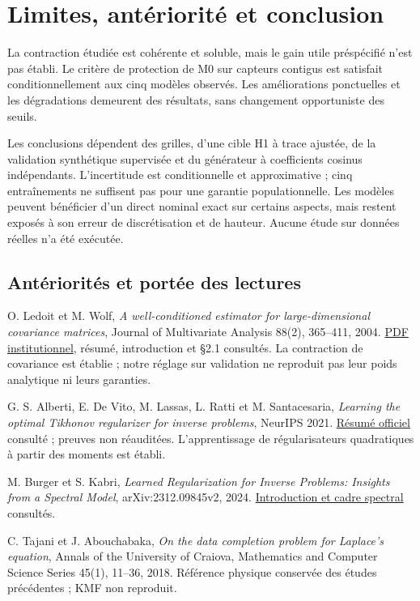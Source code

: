 \documentclass[11pt,a4paper]{article}
\begin{document}
\newpage
\section{Limites, antériorité et conclusion}
La contraction étudiée est cohérente et soluble, mais le gain utile préspécifié n'est pas établi. Le critère de protection de M0 sur capteurs contigus est satisfait conditionnellement aux cinq modèles observés. Les améliorations ponctuelles et les dégradations demeurent des résultats, sans changement opportuniste des seuils.

Les conclusions dépendent des grilles, d'une cible H1 à trace ajustée, de la validation synthétique supervisée et du générateur à coefficients cosinus indépendants. L'incertitude est conditionnelle et approximative ; cinq entraînements ne suffisent pas pour une garantie populationnelle. Les modèles peuvent bénéficier d'un direct nominal exact sur certains aspects, mais restent exposés à son erreur de discrétisation et de hauteur. Aucune étude sur données réelles n'a été exécutée.

\subsection*{Antériorités et portée des lectures}
O. Ledoit et M. Wolf, \emph{A well-conditioned estimator for large-dimensional covariance matrices}, Journal of Multivariate Analysis 88(2), 365--411, 2004. \href{https://www.econ.uzh.ch/dam/jcr:ffffffff-961c-1dd9-ffff-ffffceb83f14/wellCond.pdf}{PDF institutionnel}, résumé, introduction et §2.1 consultés. La contraction de covariance est établie ; notre réglage sur validation ne reproduit pas leur poids analytique ni leurs garanties.

G. S. Alberti, E. De Vito, M. Lassas, L. Ratti et M. Santacesaria, \emph{Learning the optimal Tikhonov regularizer for inverse problems}, NeurIPS 2021. \href{https://papers.nips.cc/paper_files/paper/2021/hash/d3e6cd9f66f2c1d3840ade4161cf7406-Abstract.html}{Résumé officiel} consulté ; preuves non réauditées. L'apprentissage de régularisateurs quadratiques à partir des moments est établi.

M. Burger et S. Kabri, \emph{Learned Regularization for Inverse Problems: Insights from a Spectral Model}, arXiv:2312.09845v2, 2024. \href{https://arxiv.org/html/2312.09845v2}{Introduction et cadre spectral} consultés.

C. Tajani et J. Abouchabaka, \emph{On the data completion problem for Laplace's equation}, Annals of the University of Craiova, Mathematics and Computer Science Series 45(1), 11--36, 2018. Référence physique conservée des études précédentes ; KMF non reproduit.
\end{document}
